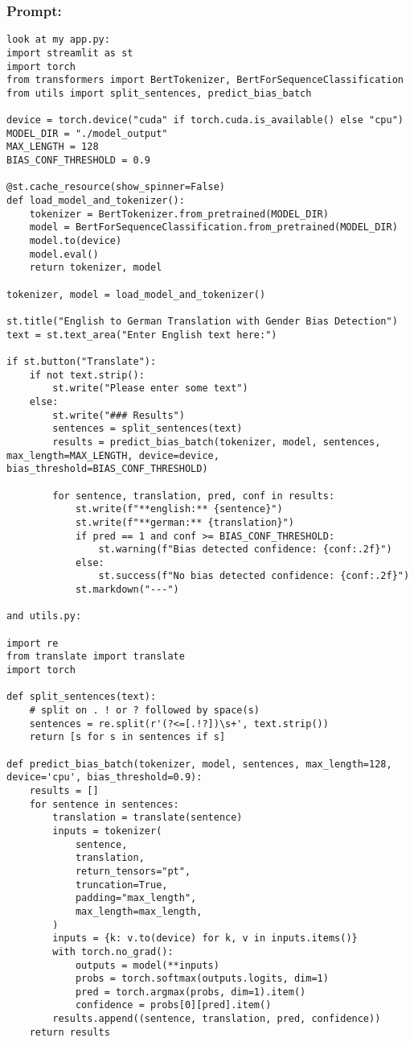 \begin{appendices}
\subsubsection{Prompt: } 

\begin{lstlisting}
look at my app.py: 
import streamlit as st
import torch
from transformers import BertTokenizer, BertForSequenceClassification
from utils import split_sentences, predict_bias_batch

device = torch.device("cuda" if torch.cuda.is_available() else "cpu")
MODEL_DIR = "./model_output" 
MAX_LENGTH = 128
BIAS_CONF_THRESHOLD = 0.9

@st.cache_resource(show_spinner=False)
def load_model_and_tokenizer():
    tokenizer = BertTokenizer.from_pretrained(MODEL_DIR)
    model = BertForSequenceClassification.from_pretrained(MODEL_DIR)
    model.to(device)
    model.eval()
    return tokenizer, model

tokenizer, model = load_model_and_tokenizer()

st.title("English to German Translation with Gender Bias Detection")
text = st.text_area("Enter English text here:")

if st.button("Translate"):
    if not text.strip():
        st.write("Please enter some text")
    else:
        st.write("### Results")
        sentences = split_sentences(text)
        results = predict_bias_batch(tokenizer, model, sentences, max_length=MAX_LENGTH, device=device, bias_threshold=BIAS_CONF_THRESHOLD)

        for sentence, translation, pred, conf in results:
            st.write(f"**english:** {sentence}")
            st.write(f"**german:** {translation}")
            if pred == 1 and conf >= BIAS_CONF_THRESHOLD:
                st.warning(f"Bias detected confidence: {conf:.2f}")
            else:
                st.success(f"No bias detected confidence: {conf:.2f}")
            st.markdown("---")

and utils.py:

import re
from translate import translate
import torch

def split_sentences(text):
    # split on . ! or ? followed by space(s)
    sentences = re.split(r'(?<=[.!?])\s+', text.strip())
    return [s for s in sentences if s]

def predict_bias_batch(tokenizer, model, sentences, max_length=128, device='cpu', bias_threshold=0.9):
    results = []
    for sentence in sentences:
        translation = translate(sentence)
        inputs = tokenizer(
            sentence,
            translation,
            return_tensors="pt",
            truncation=True,
            padding="max_length",
            max_length=max_length,
        )
        inputs = {k: v.to(device) for k, v in inputs.items()}
        with torch.no_grad():
            outputs = model(**inputs)
            probs = torch.softmax(outputs.logits, dim=1)
            pred = torch.argmax(probs, dim=1).item()
            confidence = probs[0][pred].item()
        results.append((sentence, translation, pred, confidence))
    return results


\end{lstlisting}
\end{appendices}
